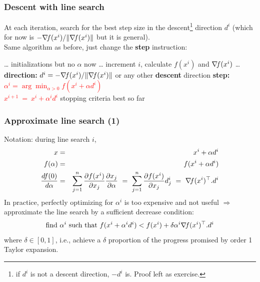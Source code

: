 \documentclass[12pt]{beamer}
\begin{document}
\begin{frame}
\frametitle{Descent with line search} 
\vspace{-0.5cm}
At each iteration, search for the best step size in the descent\footnote{if $d^i$ is not a descent direction, $-d^i$ is. Proof left as exercise.} direction $d^i$ (which for now is $-\nabla\!{f}(x^i)/\lVert \nabla\!{f}(x^i) \rVert$ but it is general).\\ 
Same algorithm as before, just change the \textbf{step} instruction:
\begin{block}{}
\begin{algorithmic}
\REQUIRE \ldots
\STATE initializations but no $\alpha$ now \ldots
\REPEAT
\STATE increment $i$, calculate $f(x^i)$ and $\nabla\!{f}(x^i)$ \ldots
\STATE \textbf{direction: } $d^i = - \nabla\!{f}(x^i) / \lVert \nabla\!{f}(x^i) \rVert$ or any other \textbf{descent} direction
\STATE \textbf{step: } \textcolor{red}{$\alpha^{i} = \arg \min_{\alpha > 0} f(x^i+\alpha d^i)$ \\
\hspace{1.5cm}$x^{i+1} ~=~ x^i + \alpha^i d^i$
} %
\UNTIL stopping criteria
\RETURN best so far
\end{algorithmic}
\end{block}
\end{frame}

\begin{frame}
\frametitle{Approximate line search (1)} 
Notation: during line search $i$, 
\begin{eqnarray*}
x &=& x^i + \alpha d^i \\
f(\alpha) &=& f(x^i + \alpha d^i) \\
\frac{df(0)}{d\alpha} &=& \sum_{j=1}^n \frac{\partial f(x^i)}{\partial x_j} \frac{\partial x_j}{\partial \alpha}
~=~\sum_{j=1}^n \frac{\partial f(x^i)}{\partial x_j} d^i_j
~=~ \nabla\!{f}(x^i)^\top . d^i
\end{eqnarray*}
In practice, perfectly optimizing for $\alpha^i$ is too expensive and not useful 
$\Rightarrow$ approximate the line search by a sufficient decrease condition:
\begin{equation*}
\text{find } \alpha^i \text{ such that } f(x^i + \alpha^i d^i) < f(x^i) + \delta \alpha^i \nabla\!{f}(x^i)^\top . d^i
\end{equation*}
where $\delta \in [0,1]$, i.e., achieve a $\delta$ proportion of the progress promised by order 1 Taylor expansion.
\end{frame}
\end{document}
